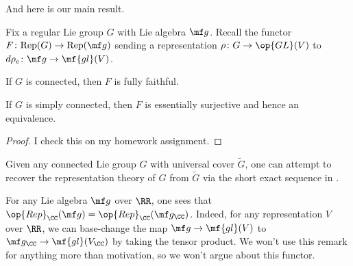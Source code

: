 \documentclass[../notes.tex]{subfiles}
\begin{document}
And here is our main result.
\begin{proposition} \label{prop:rep-theory-to-lie-alg}
	Fix a regular Lie group $G$ with Lie algebra $\mf g$. Recall the functor $F\colon\mathrm{Rep}(G)\to\mathrm{Rep}(\mf g)$ sending a representation $\rho\colon G\to\op{GL}(V)$ to $d\rho_e\colon\mf g\to\mf{gl}(V)$.
	\begin{listalph}
		\item If $G$ is connected, then $F$ is fully faithful.
		\item If $G$ is simply connected, then $F$ is essentially surjective and hence an equivalence.
	\end{listalph}
\end{proposition}
\begin{proof}
	I check this on my homework assignment.
\end{proof}
\begin{remark}
	Given any connected Lie group $G$ with universal cover $\widetilde G$, one can attempt to recover the representation theory of $G$ from $\widetilde G$ via the short exact sequence in .
\end{remark}
\begin{remark}
	For any Lie algebra $\mf g$ over $\RR$, one sees that $\op{Rep}_\CC(\mf g)=\op{Rep}_\CC(\mf g_\CC)$. Indeed, for any representation $V$ over $\RR$, we can base-change the map $\mf g\to\mf{gl}(V)$ to $\mf g_\CC\to\mf{gl}(V_\CC)$ by taking the tensor product. We won't use this remark for anything more than motivation, so we won't argue about this functor.
\end{remark}
\end{document}
